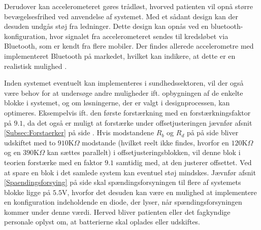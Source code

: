 Derudover kan accelerometeret gøres trådløst, hvorved patienten vil opnå større bevægelsesfrihed ved anvendelse af systemet. Med et sådant design kan der desuden undgås støj fra ledninger. Dette design kan opnås ved en bluetooth-konfiguration, hvor signalet fra accelerometeret sendes til kredsløbet via Bluetooth, som er kendt fra flere mobiler. Der findes allerede accelerometre med implementeret Bluetooth på markedet, hvilket kan indikere, at dette er en realistisk mulighed \cite{Axivity2015, Bioradio2015}. 

Inden systemet eventuelt kan implementeres i sundhedssektoren, vil der også være behov for at undersøge andre muligheder ift. opbygningen af de enkelte blokke i systemet, og om løsningerne, der er valgt i designprocessen, kan optimeres. Eksempelvis ift. den første forstærkning med en forstærkningsfaktor på $9.1$, da det også er muligt at forstærke under offsetjusteringen jævnfør afsnit \ref{Subsec:Forstaerker} på side \pageref{Subsec:Forstaerker}. Hvis modstandene $R_{b}$ og $R_{d}$ på  på side \pageref{fig:Forstaerker_faktor18} bliver udskiftet med to $910$K$\Omega$ modstande (hvilket reelt ikke findes, hvorfor en $120$K$\Omega$ og en $390$K$\Omega$ kan sættes parallelt) i offsetjusteringsblokken, vil denne blok i teorien forstærke med en faktor $9.1$ samtidig med, at den justerer offsettet. Ved at spare en blok i det samlede system kan eventuel støj mindskes. Jævnfør afsnit \ref{Spaendingsforsying} på side \pageref{Spaendingsforsying} skal spændingsforsyningen til flere af systemets blokke ligge på $5.5$V, hvorfor det desuden kan være en mulighed at implementere en konfiguration indeholdende en diode, der lyser, når spændingsforsyningen kommer under denne værdi. Herved bliver patienten eller det fagkyndige personale oplyst om, at batterierne skal oplades eller udskiftes.

